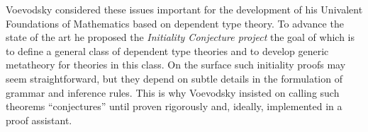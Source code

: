 \documentclass{easychair}
\begin{document}
Voevodsky considered these issues important for the development of his Univalent Foundations of Mathematics based on dependent type theory. To advance the state
of the art he proposed the {\em Initiality Conjecture project} the goal of which is to define a general class of dependent type theories and to develop generic metatheory for theories in this class. 
On the surface such initiality proofs may seem straightforward, but they depend on subtle details in the formulation of grammar and inference rules. This is why Voevodsky insisted on calling such theorems ``conjectures'' until proven rigorously and, ideally, implemented in a proof assistant.

\end{document}
